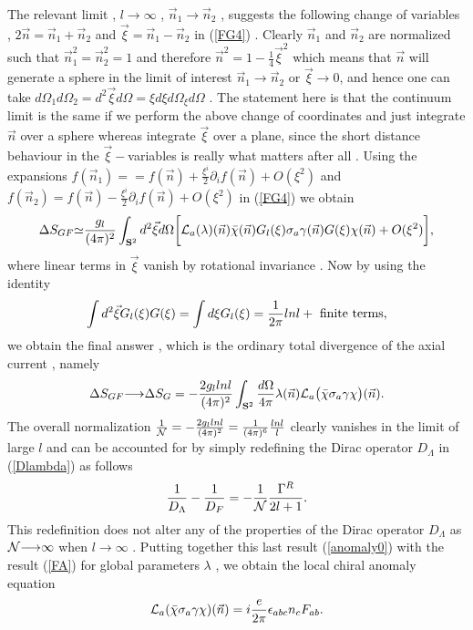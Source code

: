 \documentclass[a4paper,10pt]{article}
\begin{document}
The relevant limit , $l{\longrightarrow}{\infty}$ ,
$\vec{n}_1{\longrightarrow}\vec{n}_2$ , suggests the following
change of variables , $2\vec{n}=\vec{n}_1+\vec{n}_2$ and
$\vec{\xi}=\vec{n}_1-\vec{n}_2$ in (\ref{FG4}) . Clearly
$\vec{n}_1$ and $\vec{n}_2$ are normalized such that
$\vec{n}_1^2=\vec{n}_2^2=1$ and therefore
$\vec{n}^2=1-\frac{1}{4}\vec{\xi}^2$ which means that $\vec{n}$
will generate a sphere in the limit of interest
$\vec{n}_1{\longrightarrow}\vec{n}_2$ or
$\vec{\xi}{\longrightarrow}0$, and hence one can take
$d{\Omega}_1d{\Omega}_2=d^2\vec{\xi}d{\Omega}={\xi}d{\xi}d{\Omega}_{\xi}d{\Omega}$
. The statement here is that the continuum limit is the same if
we perform the above change of coordinates and just integrate
$\vec{n}$ over a sphere whereas integrate $\vec{\xi}$ over a
plane, since the short distance behaviour in the
$\vec{\xi}-$variables is really what matters after all . Using
the expansions
$f(\vec{n}_1)==f(\vec{n})+\frac{\xi^i}{2}{\partial}_if(\vec{n})+O(\xi^2)$
and
$f(\vec{n}_2)=f(\vec{n})-\frac{\xi^i}{2}{\partial}_if(\vec{n})+O(\xi^2)$
in (\ref{FG4}) we obtain
\begin{eqnarray}
{\Delta}{S}_{GF}{\simeq}\frac{g_l}{(4{\pi})^2}\int_{{\bf
S}^2}d^2\vec{\xi}d{\Omega}\bigg[{\cal
L}_a({\lambda})(\vec{n})\bar{\chi}(\vec{n})G_l(\xi){\sigma}_a{\gamma}(\vec{n})G(\xi){\chi}(\vec{n})+O({\xi}^2)\bigg],\label{429}
\end{eqnarray}
where linear terms in $\vec{\xi}$ vanish by rotational invariance . Now by using the identity
\begin{eqnarray}
\int d^2\vec{\xi}G_l(\xi)G(\xi)=\int d{\xi}G_l(\xi)=\frac{1}{2\pi}ln l +~{\rm finite}~ {\rm terms},\label{result}
\end{eqnarray}
we obtain the final answer , which is the ordinary total divergence of the axial current , namely
\begin{eqnarray}
{\Delta}{S}_{GF}{\longrightarrow}{\Delta}{S}_{G}=-\frac{2g_llnl}{(4{\pi})^2}\int_{{\bf
S}^2}\frac{d{\Omega}}{4{\pi}}{\lambda}(\vec{n}){\cal
L}_a\big(\bar{\chi}{\sigma}_a{\gamma}{\chi}\big)(\vec{n}).\label{anomaly0}
\end{eqnarray}
The overall normalization $\frac{1}{\cal N}=-\frac{2g_llnl}{(4{\pi})^2}=\frac{1}{(4{\pi})^6}\frac{lnl}{l}$ clearly vanishes in the limit of large $l$ and can be accounted for by simply redefining the Dirac operator $D_{\Lambda}$ in (\ref{Dlambda}) as follows
\begin{eqnarray}
\frac{1}{D_{\Lambda}}-\frac{1}{D_{F}}=-\frac{1}{\cal N}\frac{{\Gamma}^R}{2l+1}.
\end{eqnarray}
This redefinition does not alter any of the properties of the Dirac operator $D_{\Lambda}$ as ${\cal N}{\longrightarrow}{\infty}$ when $l{\longrightarrow}{\infty}$ . Putting together this last result (\ref{anomaly0}) with the result
(\ref{FA}) for global parameters ${\lambda}$ , we obtain the local chiral anomaly
equation
\begin{eqnarray}
{\cal
L}_a(\bar{\chi}{\sigma}_a{\gamma}{\chi})(\vec{n})=i\frac{e}{2{\pi}}{\epsilon}_{abc}n_cF_{ab}.
\end{eqnarray}
\end{document}
